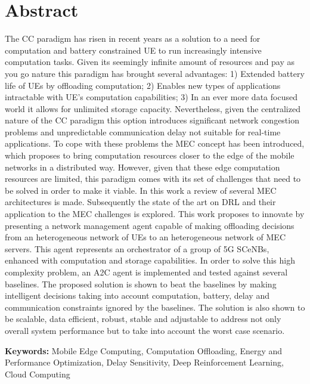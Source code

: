 \section*{Abstract}


\noindent The \acrfull{CC} paradigm has risen in recent years as a solution to a need for computation and battery constrained \acrfull{UE} to run increasingly intensive computation tasks. Given its seemingly infinite amount of resources and pay as you go nature this paradigm has brought several advantages: 1) Extended battery life of \acrfull{UE}s by offloading computation; 2) Enables new types of applications intractable with \acrfull{UE}'s computation capabilities; 3) In an ever more data focused world it allows for unlimited storage capacity. Nevertheless, given the centralized nature of the \acrshort{CC} paradigm this option introduces significant network congestion problems and unpredictable communication delay not suitable for real-time applications. To cope with these problems the \acrfull{MEC} concept has been introduced, which proposes to bring computation resources closer to the edge of the mobile networks in a distributed way. However, given that these edge computation resources are limited, this paradigm comes with its set of challenges that need to be solved in order to make it viable. In this work a review of several \acrshort{MEC} architectures is made. Subsequently the state of the art on \acrfull{DRL} and their application to the \acrshort{MEC} challenges is explored. This work proposes to innovate by presenting a network management agent capable of making offloading decisions from an heterogeneous network of \acrshort{UE}s to an  heterogeneous network of \acrshort{MEC} servers. This agent represents an orchestrator of a group of 5G \acrfull{SCeNBs}, enhanced with computation and storage capabilities. In order to solve this high complexity problem, an \acrfull{A2C} agent is implemented and tested against several baselines. The proposed solution is shown to beat the baselines by making intelligent decisions taking into
account computation, battery, delay and communication constraints ignored by the baselines. The solution is also shown to be scalable, data efficient, robust, stable and adjustable to address not only overall system performance but to take into account the worst case scenario.

\vfill

\textbf{\Large Keywords:} Mobile Edge Computing, Computation Offloading, Energy and Performance Optimization, Delay Sensitivity, Deep Reinforcement Learning, Cloud Computing

